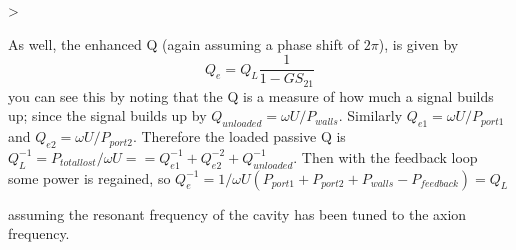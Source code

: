 >\documentclass[aps,prl,twocolumn,groupedaddress]{revtex4-1}
\begin{document}
As well, the enhanced Q (again assuming a phase shift of $2\pi$), is given by \cite{ref:frenchpaper}
\begin{equation}
Q_e = Q_L\frac{1}{1-GS_{21}}
\end{equation}
you can see this by noting that the Q is a measure of how much a signal builds up; since the signal builds up by 
$Q_{unloaded} = \omega U / P_{walls}$.
Similarly
$Q_{e1} = \omega U / P_{port1}$ and $Q_{e2} = \omega U / P_{port2}$.
Therefore the loaded passive Q is $Q_L^{-1} = P_{total lost}/\omega U =  = Q_{e1}^{-1} + Q_{e2}^{-2} + Q_{unloaded}^{-1}$.
Then with the feedback loop some power is regained, so 
$Q_e^{-1} = 1/\omega U (P_{port1} + P_{port2} + P_{walls} - P_{feedback}) = Q_L$

    assuming the resonant frequency of the cavity has been tuned to the axion frequency. 
\end{document}

